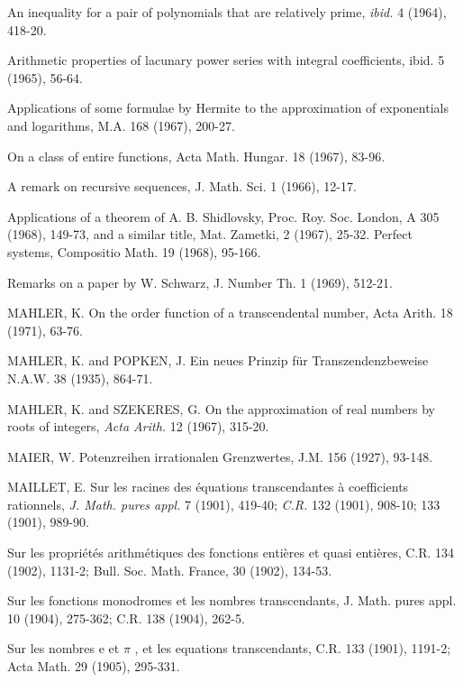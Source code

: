 \begin{hanglist}
    \item An inequality for a pair of polynomials that are relatively prime, \textit{ibid.} 4 (1964), 418-20.
    \item Arithmetic properties of lacunary power series with integral coefficients, ibid. 5 (1965), 56-64.
    \item Applications of some formulae by Hermite to the approximation of exponentials and logarithms, M.A. 168 (1967), 200-27.
    \item On a class of entire functions, Acta Math. Hungar. 18 (1967), 83-96.
    \item A remark on recursive sequences, J. Math. Sci. 1 (1966), 12-17.
    \item Applications of a theorem of A. B. Shidlovsky, Proc. Roy. Soc. London, A 305 (1968), 149-73, and a similar title, Mat. Zametki, 2 (1967), 25-32. Perfect systems, Compositio Math. 19 (1968), 95-166.
    \item Remarks on a paper by W. Schwarz, J. Number Th. 1 (1969), 512-21.
    \item MAHLER, K. On the order function of a transcendental number, Acta Arith. 18 (1971), 63-76.
    \item MAHLER, K. and POPKEN, J. Ein neues Prinzip für Transzendenzbeweise N.A.W. 38 (1935), 864-71.
    \item MAHLER, K. and SZEKERES, G. On the approximation of real numbers by roots of integers, \textit{Acta Arith.} 12 (1967), 315-20.
    \item MAIER, W. Potenzreihen irrationalen Grenzwertes, J.M. 156 (1927), 93-148.
    \item MAILLET, E. Sur les racines des équations transcendantes à coefficients rationnels, \textit{J. Math. pures appl.} 7 (1901), 419-40; \textit{C.R.} 132 (1901), 908-10; 133 (1901), 989-90.
    \item \hspace{1.5em} Sur les propriétés arithmétiques des fonctions entières et quasi entières, C.R. 134 (1902), 1131-2; Bull. Soc. Math. France, 30 (1902), 134-53.
    \item \hspace{1.5em} Sur les fonctions monodromes et les nombres transcendants, J. Math. pures appl. 10 (1904), 275-362; C.R. 138 (1904), 262-5.
    \item \hspace{1.5em} Sur les nombres e et  $\pi$ , et les equations transcendants, C.R. 133 (1901), 1191-2; Acta Math. 29 (1905), 295-331.

\end{hanglist}
